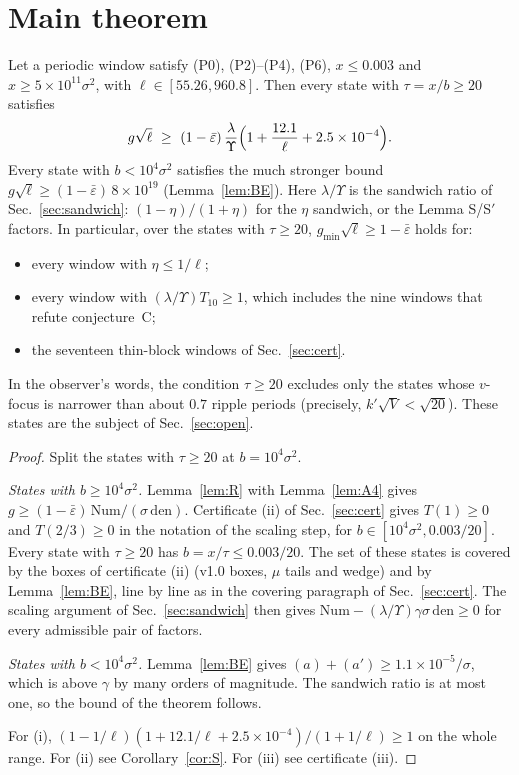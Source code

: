 \section{Main theorem}
\label{sec:theorem}

\begin{theorem}[Theorem H1] 
\label{thm:H1}
Let a periodic window satisfy (P0), (P2)--(P4), (P6), $x\le0.003$ and $x\ge5\times10^{11}\sigma^2$, with $\ell\in[55.26,960.8]$.
Then every state with $\tau=x/b\ge20$ satisfies
\begin{equation}
g\sqrt\ell\ \ge\ (1-\bar\varepsilon)\,\frac{\lambda}{\Upsilon}\Bigl(1+\frac{12.1}{\ell}+2.5\times10^{-4}\Bigr).
\end{equation}
Every state with $b<10^4\sigma^2$ satisfies the much stronger bound $g\sqrt\ell\ge(1-\bar\varepsilon)\,8\times10^{19}$ (Lemma~\ref{lem:BE}).
Here $\lambda/\Upsilon$ is the sandwich ratio of Sec.~\ref{sec:sandwich}: $(1-\eta)/(1+\eta)$ for the $\eta$ sandwich, or the Lemma S/S$'$ factors.
In particular, over the states with $\tau\ge20$, $g_{\min}\sqrt\ell\ge1-\bar\varepsilon$ holds for:
\begin{itemize}
\item[(i)] every window with $\eta\le1/\ell$;
\item[(ii)] every window with $(\lambda/\Upsilon)T_{10}\ge1$, which includes the nine windows that refute conjecture~C;
\item[(iii)] the seventeen thin-block windows of Sec.~\ref{sec:cert}.
\end{itemize}
\end{theorem}
In the observer's words, the condition $\tau\ge20$ excludes only the states whose $v$-focus is narrower than about $0.7$ ripple periods (precisely, $k'\sqrt V<\sqrt{20}$).
These states are the subject of Sec.~\ref{sec:open}.
\begin{proof}
Split the states with $\tau\ge20$ at $b=10^4\sigma^2$.

\emph{States with $b\ge10^4\sigma^2$.}
Lemma~\ref{lem:R} with Lemma~\ref{lem:A4} gives $g\ge(1-\bar\varepsilon)\,\mathrm{Num}/(\sigma\,\mathrm{den})$.
Certificate (ii) of Sec.~\ref{sec:cert} gives $T(1)\ge0$ and $T(2/3)\ge0$ in the notation of the scaling step, for $b\in[10^4\sigma^2,0.003/20]$.
Every state with $\tau\ge20$ has $b=x/\tau\le0.003/20$.
The set of these states is covered by the boxes of certificate (ii) (v1.0 boxes, $\mu$ tails and wedge) and by Lemma~\ref{lem:BE}, line by line as in the covering paragraph of Sec.~\ref{sec:cert}.
The scaling argument of Sec.~\ref{sec:sandwich} then gives $\mathrm{Num}-(\lambda/\Upsilon)\gamma\sigma\,\mathrm{den}\ge0$ for every admissible pair of factors.

\emph{States with $b<10^4\sigma^2$.}
Lemma~\ref{lem:BE} gives $(a)+(a')\ge1.1\times10^{-5}/\sigma$, which is above $\gamma$ by many orders of magnitude.
The sandwich ratio is at most one, so the bound of the theorem follows.

For (i), $(1-1/\ell)(1+12.1/\ell+2.5\times10^{-4})/(1+1/\ell)\ge1$ on the whole range.
For (ii) see Corollary~\ref{cor:S}.
For (iii) see certificate (iii).
\end{proof}

